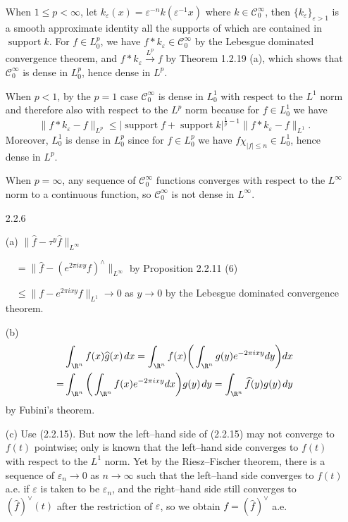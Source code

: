 \begin{itemize}
When $1\leq p<\infty$, let $k_\varepsilon(x)
=\varepsilon^{-n}k(\varepsilon^{-1}x)$ where $k\in \mathscr{C}_0^\infty$, 
then $\{k_\varepsilon\}_{\varepsilon>1}$ is a smooth approximate identity 
all the supports of which are contained in $\operatorname{support}k$. 
For $f\in L^p_0$, we have $f*k_\varepsilon\in \mathscr{C}_0^\infty$ 
by the Lebesgue dominated convergence theorem, 
and $f*k_\varepsilon\stackrel{L^p}{\longrightarrow}f$ by Theorem 1.2.19 (a), 
which shows that $\mathscr{C}_0^\infty$ is dense in $L_0^p$, 
hence dense in $L^p$.

When $p<1$, by the $p=1$ case $\mathscr{C}_0^\infty$ 
is dense in $L_0^1$ with respect to the $L^1$ norm 
and therefore also with respect to the $L^p$ norm 
because for $f\in L_0^1$ we have
$$\|f*k_\varepsilon-f\|_{L^p}\leq |\operatorname{support}f+\operatorname{support}k|^{\frac{1}{p}-1}\|f*k_\varepsilon-f\|_{L^1}.$$
Moreover, $L_0^1$ is dense in $L_0^p$ since for $f\in L_0^p$ 
we have $f\chi_{|f|\leq n}\in L_0^1$, hence dense in $L^p$.

When $p=\infty$, any sequence of $\mathscr{C}_0^\infty$ functions converges 
with respect to the $L^\infty$ norm to a continuous function, 
so $\mathscr{C}_0^\infty$ is not dense in $L^\infty$.

\item[2.2.6]

(a) $\|\hat{f}-\tau^y\hat{f}\|_{L^\infty}$

\ \ $=\|\hat{f}-(e^{2\pi ixy}f)^\wedge\|_{L^\infty}$ by Proposition 2.2.11 (6)

\ \ $\leq\|f-e^{2\pi ixy}f\|_{L^1}\rightarrow0$ as $y\rightarrow0$ by the Lebesgue dominated convergence theorem.

(b) \begin{align*}
     &\int_{\R^n}f(x)\widehat{g}(x)\>dx=\int_{\R^n}f(x)\bigg(\int_{\R^n}g(y)e^{-2\pi ixy}dy\bigg)dx \\
     =&\int_{\R^n}\bigg(\int_{\R^n}f(x)e^{-2\pi ixy}dx\bigg)g(y)\>dy=\int_{\R^n}\widehat{f}(y)g(y)\>dy
\end{align*}
by Fubini's theorem.

(c) Use (2.2.15). But now the left--hand side of (2.2.15) may not converge to $f(t)$ pointwise; 
only is known that the left--hand side converges to $f(t)$ with respect to the $L^1$ norm. 
Yet by the Riesz--Fischer theorem, there is a sequence of  $\varepsilon_n\rightarrow0$ as $n\rightarrow\infty$ 
such that the left--hand side converges to $f(t)$ a.e. if $\varepsilon$ is taken to be $\varepsilon_n$, 
and the right--hand side still converges to $(\hat{f})^\vee(t)$ 
after the restriction of $\varepsilon$, so we obtain $f=(\hat{f})^\vee$ a.e.


\end{itemize}
